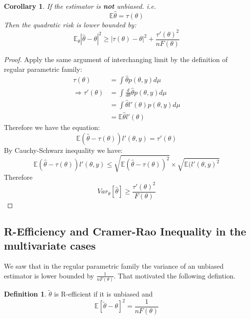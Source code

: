 \documentclass[a4paper,12pt, oneside, fleqn]{book}
\newtheorem{corollary}{Corollary}[theorem]
\theoremstyle{definition}
\newtheorem{definition}{Definition}[section]
\theoremstyle{remark}
\begin{document}
\begin{corollary}
If the estimator is\textbf{ not} unbiased. i.e.
\begin{equation*}
	\mathbb{E}\hat{\theta} = \tau(\theta)
\end{equation*}
	Then the quadratic risk is lower bounded by:
	\begin{equation*}
		\mathbb{E}_\theta |\hat{\theta} - \theta |^2 \geq |\tau(\theta) - \theta|^2 + \frac{\tau'(\theta)^2}{n F(\theta)}
	\end{equation*}
\end{corollary}


\begin{proof}
	Apply the same argument of interchanging limit by the definition of regular parametric family:
	\begin{align*}
		\tau(\theta) &= \int \hat{\theta}p(\theta, y) d\mu\\
		\Rightarrow \tau'(\theta) &=\int \frac{d}{d\theta} \hat{\theta} p(\theta, y) d\mu\\
		&= \int \hat{\theta}l'(\theta)p(\theta, y) d\mu\\
		&= \mathbb{E} \hat{\theta}l'(\theta)
	\end{align*}
	Therefore we have the equation:
	\begin{equation}
		\mathbb{E}(\hat{\theta} - \tau(\theta))l'(\theta,y) = \tau'(\theta)
	\end{equation}
	By Cauchy-Schwarz inequality we have:
	\begin{equation*}
		\mathbb{E}(\hat{\theta} - \tau(\theta))l'(\theta, y) \leq \sqrt{\mathbb{E}(\hat{\theta} - \tau(\theta))^2} \times \sqrt{\mathbb{E}(l'(\theta, y)^2}
	\end{equation*}
	Therefore
	\begin{equation*}
		Var_\theta [\hat{\theta}] \geq \frac{\tau'(\theta)^2}{F(\theta)}
	\end{equation*}
\end{proof}


\subsection{R-Efficiency and Cramer-Rao Inequality in the multivariate cases}
We saw that in the regular parametric family the variance of an unbiased estimator is lower bounded by $\frac{1}{nF(\theta)}$. That motivated the following defintion.
\begin{definition}
	$\tilde{\theta}$ is R-efficient if it is unbiased and 
	\begin{equation}
		\mathbb{E}[\tilde{\theta} - \theta]^2 = \frac{1}{nF(\theta)}
 	\end{equation}
\end{definition}
\end{document}
